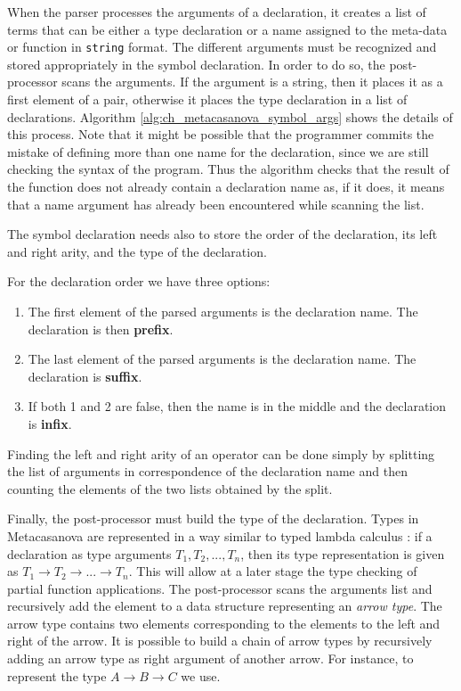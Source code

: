 When the parser processes the arguments of a declaration, it creates a list of terms that can be either a type declaration or a name assigned to the meta-data or function in \texttt{string} format. The different arguments must be recognized and stored appropriately in the symbol declaration. In order to do so, the post-processor scans the arguments. If the argument is a string, then it places it as a first element of a pair, otherwise it places the type declaration in a list of declarations. Algorithm \ref{alg:ch_metacasanova_symbol_args} shows the details of this process. Note that it might be possible that the programmer commits the mistake of defining more than one name for the declaration, since we are still checking the syntax of the program. Thus the algorithm checks that the result of the function does not already contain a declaration name as, if it does, it means that a name argument has already been encountered while scanning the list.

The symbol declaration needs also to store the order of the declaration, its left and right arity, and the type of the declaration. 

For the declaration order we have three options:

\begin{enumerate}[noitemsep]
	\item The first element of the parsed arguments is the declaration name. The declaration is then \textbf{prefix}.
	\item The last element of the parsed arguments is the declaration name. The declaration is \textbf{suffix}.
	\item If both 1 and 2 are false, then the name is in the middle and the declaration is \textbf{infix}.
\end{enumerate}

Finding the left and right arity of an operator can be done simply by splitting the list of arguments in correspondence of the declaration name and then counting the elements of the two lists obtained by the split.

Finally, the post-processor must build the type of the declaration. Types in Metacasanova are represented in a way similar to typed lambda calculus \cite{barendregt2013lambda, church1940formulation}: if a declaration as type arguments $T_{1}, T_{2}, ..., T_{n}$, then its type representation is given as $T_{1} \rightarrow T_{2} \rightarrow ... \rightarrow T_{n}$. This will allow at a later stage the type checking of partial function applications. The post-processor scans the arguments list and recursively add the element to a data structure representing an \textit{arrow type}. The arrow type contains two elements corresponding to the elements to the left and right of the arrow. It is possible to build a chain of arrow types by recursively adding an arrow type as right argument of another arrow. For instance, to represent the type $A \rightarrow B \rightarrow C$ we use.

